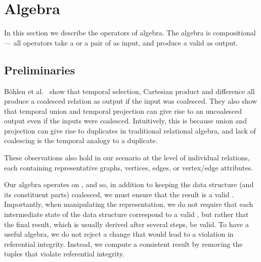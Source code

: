\section{Algebra}
\label{sec:algebra}

In this section we describe the operators of \tg algebra.  The algebra
is compositional --- all operators take a \tg or a pair of \tgs as
input, and produce a valid \tg as output.


\subsection{Preliminaries}
\label{sec:algebra:prelim}

B\"ohlen et al.~\cite{DBLP:conf/vldb/BohlenSS96} show that temporal
selection, Cartesian product and difference all produce a coalesced
relation as output if the input was coalesced.  They also show that
temporal union and temporal projection can give rise to an uncoalesced
output even if the inputs were coalesced.  Intuitively, this is
because union and projection can give rise to duplicates in
traditional relational algebra, and lack of coalescing is the temporal
analogy to a duplicate.

These observations also hold in our scenario at the level of
individual relations, each containing representative graphs, vertices,
edges, or vertex/edge attributes.

Our algebra operates on \tgs, and so, in addition to keeping the data
structure (and its constituent parts) coalesced, we must ensure that
the result is a valid \tg.  Importantly, when manipulating the \ve
representation, we do not require that each intermediate state of the
data structure correspond to a valid \tg, but rather that the final
result, which is usually derived after several steps, be valid.  To
have a useful algebra, we do not reject a change that would lead to a
violation in referential integrity.  Instead, we compute a consistent
result by removing the tuples that violate referential integrity.

